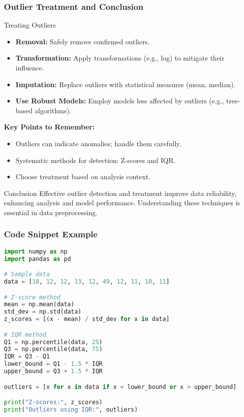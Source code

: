 \documentclass[aspectratio=169]{beamer}
\begin{document}
\begin{frame}[fragile]
    \frametitle{Outlier Treatment and Conclusion}
    \begin{block}{Treating Outliers}
        \begin{itemize}
            \item \textbf{Removal:} Safely remove confirmed outliers.
            \item \textbf{Transformation:} Apply transformations (e.g., log) to mitigate their influence.
            \item \textbf{Imputation:} Replace outliers with statistical measures (mean, median).
            \item \textbf{Use Robust Models:} Employ models less affected by outliers (e.g., tree-based algorithms).
        \end{itemize}
    \end{block}

    \textbf{Key Points to Remember:}
    \begin{itemize}
        \item Outliers can indicate anomalies; handle them carefully.
        \item Systematic methods for detection: Z-scores and IQR.
        \item Choose treatment based on analysis context.
    \end{itemize}

    \begin{block}{Conclusion}
        Effective outlier detection and treatment improve data reliability, enhancing analysis and model performance. Understanding these techniques is essential in data preprocessing.
    \end{block}
\end{frame}

\begin{frame}[fragile]
    \frametitle{Code Snippet Example}
    \begin{lstlisting}[language=Python]
import numpy as np
import pandas as pd

# Sample data
data = [10, 12, 12, 13, 12, 49, 12, 11, 10, 11]

# Z-score method
mean = np.mean(data)
std_dev = np.std(data)
z_scores = [(x - mean) / std_dev for x in data]

# IQR method
Q1 = np.percentile(data, 25)
Q3 = np.percentile(data, 75)
IQR = Q3 - Q1
lower_bound = Q1 - 1.5 * IQR
upper_bound = Q3 + 1.5 * IQR

outliers = [x for x in data if x < lower_bound or x > upper_bound]

print("Z-scores:", z_scores)
print("Outliers using IQR:", outliers)
    \end{lstlisting}
\end{frame}
\end{document}
